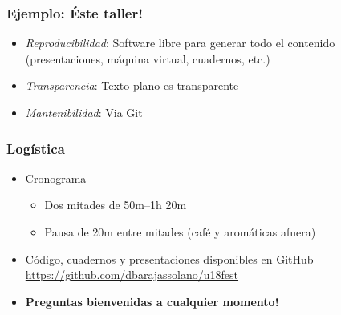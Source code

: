 \documentclass[xcolor=dvipsnames,10pt]{beamer}
\begin{document}
%
\begin{frame}
  \frametitle{Ejemplo: Éste taller!}
  \begin{itemize}
  \item \emph{Reproducibilidad}: Software libre para generar todo el contenido (presentaciones, máquina virtual, cuadernos, etc.)
  \item \emph{Transparencia}: Texto plano es transparente
  \item \emph{Mantenibilidad}: Via \textsf{Git}
  \end{itemize}
\end{frame}
%
\begin{frame}
  \frametitle{Logística}
  \begin{itemize}
  \item Cronograma
    \begin{itemize}
    \item Dos mitades de 50m--1h 20m
    \item Pausa de 20m entre mitades (café y aromáticas afuera)
    \end{itemize}
  \item Código, cuadernos y presentaciones disponibles en \textsf{GitHub}\\
    \url{https://github.com/dbarajassolano/u18fest}
  \item \textbf{Preguntas bienvenidas a cualquier momento!}
  \end{itemize}
\end{frame}
\end{document}
